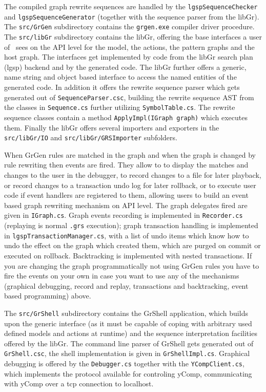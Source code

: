 The compiled graph rewrite sequences are handled by the \texttt{lgsp\-Sequence\-Checker} and \texttt{lgsp\-Sequence\-Generator} (together with the sequence parser from the libGr).
The \texttt{src/GrGen} subdirectory contains the \texttt{grgen.exe} compiler driver procedure.
The \texttt{src/libGr} subdirectory contains the libGr, offering the base interfaces a user of \GrG~sees on the API level for the model, the actions, the pattern graphs and the host graph.
The interfaces get implemented by code from the libGr search plan (lgsp) backend and by the generated code.
The libGr further offers a generic, name string and object based interface to access the named entities of the generated code.
In addition it offers the rewrite sequence parser which gets generated out of \texttt{SequenceParser.csc},
building the rewrite sequence AST from the classes in \texttt{Sequence.cs} further utilizing \texttt{SymbolTable.cs}.
The rewrite sequence classes contain a method \texttt{ApplyImpl(IGraph graph)} which executes them.
Finally the libGr offers several importers and exporters in the \texttt{src/libGr/IO} and \texttt{src/libGr/GRSImporter} subfolders.

When GrGen rules are matched in the graph and when the graph is changed by rule rewriting then events are fired.
They allow to to display the matches and changes to the user in the debugger,
to record changes to a file for later playback, or record changes to a transaction undo log for later rollback, 
or to execute user code if event handlers are registered to them,
allowing users to build an event based graph rewriting mechanism on API level.
The graph delegates fired are given in \texttt{IGraph.cs}.
Graph events recording is implemented in \texttt{Recorder.cs} (replaying is normal \texttt{.grs} execution);
graph transaction handling is implemented in \texttt{lgspTransactionManager.cs}, with a list of undo items which know how to undo the effect on the graph which created them, which are purged on commit or executed on rollback.
Backtracking is implemented with nested transactions.
If you are changing the graph programmatically not using GrGen rules you have to fire the events on your own in case you want to use any of the mechanisms (graphical debugging, record and replay, transactions and backtracking, event based programming) above.

The \texttt{src/GrShell} subdirectory contains the GrShell application, which builds upon the generic interface (as it must be capable of coping with arbitrary used defined models and actions at runtime) and the sequence interpretation facilities offered by the libGr.
The command line parser of GrShell gets generated out of \texttt{GrShell.csc}, the shell implementation is given in \texttt{GrShellImpl.cs}.
Graphical debugging is offered by the \texttt{Debugger.cs} together with the \texttt{YCompClient.cs}, which implements the protocol available for controling yComp, communicating with yComp over a tcp connection to localhost.

